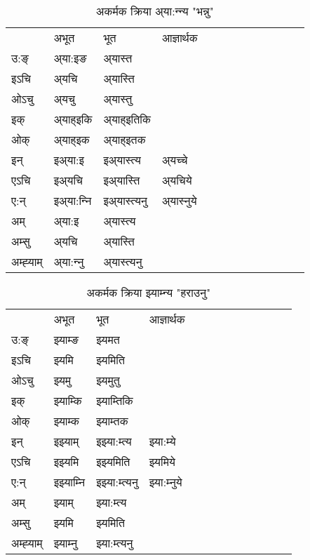\begin{table}[H]
\centering
\caption{\label{ɛt.vi} अकर्मक क्रिया  अ्या:न्‍न्य  "भन्नु"  }
\begin{tabular}{l|l|l|l|l|l|l|l|l|l|l|l|l}  \toprule
&अभूत & भूत & आज्ञार्थक \\ 
उ:ङ्‌ &अ्या:इङ &अ्यास्त \\ 
इऽचि &अ्यचि &अ्यास्ति   \\ 
ओऽचु &अ्यचु &अ्यास्तु   \\ 
इक् &अ्याह्इकि &अ्याह्इतिकि   \\ 
ओक् &अ्याह्इक &अ्याह्इतक   \\ 
इन् & इअ्या:इ & इअ्यास्त्य &अ्यच्‍चे  \\ 
एऽचि & इअ्यचि & इअ्यास्ति &अ्यचिये    \\ 
ए:न् & इअ्या:न्‍नि  & इअ्यास्त्यनु &अ्यास्‍नुये  \\ 
अम् & अ्या:इ & अ्यास्त्य   \\ 
अम्सु & अ्यचि & अ्यास्ति   \\ 
अम्ह्‍याम् & अ्या:न्‍नु  & अ्यास्त्यनु \\ 
\bottomrule
\end{tabular}
\end{table}


\begin{table}[H]
\centering
\caption{\label{ɛm.vi} अकर्मक क्रिया  झ्याम्‍न्य  "हराउनु"  }
\begin{tabular}{l|l|l|l|l|l|l|l|l|l|l|l|l}  \toprule
&अभूत & भूत & आज्ञार्थक \\ 
उ:ङ्‌ &झ्याम्ङ &झ्यमत \\ 
इऽचि &झ्यमि &झ्यमिति   \\ 
ओऽचु &झ्यमु &झ्यमुतु   \\ 
इक् &झ्याम्कि &झ्याम्तिकि   \\ 
ओक् &झ्याम्क &झ्याम्तक   \\ 
इन् & इझ्याम् & इझ्या:म्त्य &झ्या:म्ये  \\ 
एऽचि & इझ्यमि & इझ्यमिति &झ्यमिये    \\ 
ए:न् & इझ्याम्‍नि  & इझ्या:म्त्यनु &झ्या:म्‍नुये  \\ 
अम् & झ्याम् & झ्या:म्त्य   \\ 
अम्सु & झ्यमि & झ्यमिति   \\ 
अम्ह्‍याम् & झ्याम्‍नु  & झ्या:म्त्यनु \\ 
\bottomrule
\end{tabular}
\end{table}


